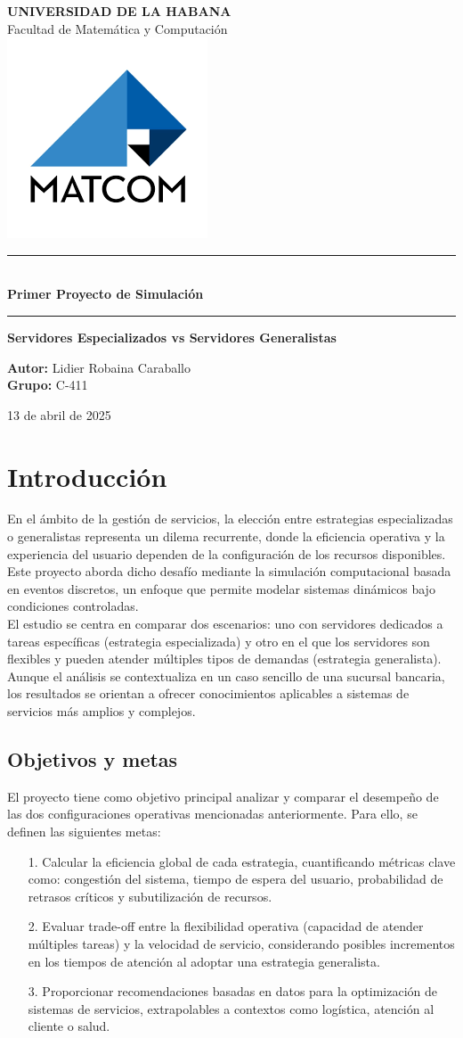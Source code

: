 \documentclass[letterpaper, 12pt]{report}
\newcommand*{\customtitlepage}{
    \begin{titlepage}
        \begin{center}
            \vspace*{1cm}
            
            
            {\LARGE \textbf{UNIVERSIDAD DE LA HABANA}}\\
            \vspace{0.5cm}
            {\Large Facultad de Matem\'atica y Computaci\'on}\\
            

            \includegraphics[scale=0.5]{images/logo.png}
            
            \vspace{1cm}
            
            
            \rule{\textwidth}{1.5pt}\\
            \vspace{0.5cm}
            {\LARGE \textcolor{primary}{\textbf{Primer Proyecto de Simulación}}}
            \vspace{0.5cm}
            \rule{\textwidth}{1.5pt}
            
            \vspace{2cm}
            
            {\Large \textbf{Servidores Especializados vs Servidores Generalistas}}\\
            \vspace{1cm}
            
            {\Large \textbf{Autor:} Lidier Robaina Caraballo \\
            \vspace{0.5cm}
            {\Large \textbf{Grupo:} C-411 }\\
            \vspace{1.5cm}
            
            {\Large 13 de abril de 2025
            }
            }
        \end{center}
    \end{titlepage}
}
\begin{document}
\customtitlepage

\tableofcontents
\thispagestyle{empty}
\cleardoublepage

\setcounter{page}{1}

\chapter{Introducción}


En el ámbito de la gestión de servicios, la elección entre estrategias especializadas o generalistas representa 
un dilema recurrente, donde la eficiencia operativa y la experiencia del usuario dependen de la configuración 
de los recursos disponibles. Este proyecto aborda dicho desafío mediante la simulación computacional 
basada en eventos discretos, un enfoque que permite modelar sistemas dinámicos bajo condiciones
controladas. \\

El estudio se centra en comparar dos escenarios: uno con servidores dedicados a tareas específicas
(estrategia especializada) y otro en el que los servidores son flexibles y pueden atender múltiples tipos
de demandas (estrategia generalista). Aunque el análisis se contextualiza en un caso sencillo de una sucursal bancaria,
los resultados se orientan a ofrecer conocimientos aplicables a sistemas de servicios más amplios y complejos.

\section{Objetivos y metas}
El proyecto tiene como objetivo principal analizar y comparar el desempeño de las dos configuraciones operativas mencionadas anteriormente. Para ello, se definen las siguientes metas:

\begin{itemize}
    \item[1.] Calcular la eficiencia global de cada estrategia, cuantificando métricas clave como: congestión del sistema, tiempo de espera del usuario, 
    probabilidad de retrasos críticos y subutilización de recursos.  
    \item[2.] Evaluar trade-off entre la flexibilidad operativa (capacidad de atender múltiples tareas) y la velocidad de servicio, considerando posibles incrementos en los tiempos de atención al adoptar una estrategia generalista.
    \item[3.] Proporcionar recomendaciones basadas en datos para la optimización de sistemas de servicios, extrapolables a contextos como logística, atención al cliente o salud.
\end{itemize}
\end{document}
